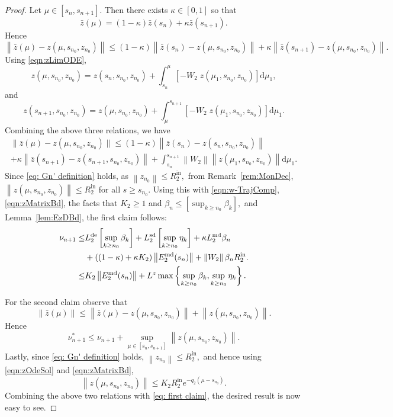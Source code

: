 \documentclass[usenames,dvipsnames,final,12pt]{colt2018} %
\newcommand{\Ww}{W_2}
\newcommand{\lz}{q_2}
\newcommand{\Rzi}{R_2^{\textrm{in}}}
\newcommand{\rz}{\nu}
\newcommand{\rzS}{\nu^{*}}
\newcommand{\barz}{\bar{z}}
\newcommand{\Ez}{E_2}
\newcommand{\Lz}{L^z}
\newcommand{\LzD}{L_2^{\dt}}
\newcommand{\LzM}{L_2^{\md}}
\newcommand{\LzS}{L_2^{\sd}}
\newcommand{\Kz}{K_2}
\newcommand{\EzM}{\Ez^{\md}}
\newcommand{\zSol}[1]{z(#1, \sI{n_0}, z_{n_0})}
\newcommand{\dt}{\text{de}}
\newcommand{\md}{\text{md}}
\newcommand{\sd}{\text{sd}}
\newcommand{\df}{\mathrm{d}}
\newcommand{\sI}[1]{s_{#1}}
\newcommand{\norm}[1]{\left\lVert#1\right\rVert}
\newcommand{\gal}[1]{#1}
\begin{document}
\begin{proof}
Let $\mu \in [\sI{n}, \sI{n+ 1}].$ Then there exists $\kappa \in [0,1]$ so that
%
\[
\barz(\mu) = (1 - \kappa) \barz(\sI{n}) + \kappa \barz(\sI{n + 1}).
\]
%
Hence
%
\[
\norm{\barz(\mu) - \zSol{\mu}} \leq   (1 - \kappa) \norm{\barz(\sI{n}) - \zSol{\mu}} + \kappa \norm{\barz(\sI{n + 1}) - \zSol{\mu}}.
\]
%
Using \eqref{eqn:zLimODE},
%
\[
\zSol{\mu} = \zSol{\sI{n}} + \int_{\sI{n}}^{\mu} [- \Ww \; \zSol{\mu_1}] \df \mu_1,
\]
%
and
%
\[
\zSol{\sI{n + 1}} = \zSol{\mu} + \int_{\mu}^{\sI{n + 1}} [- \Ww \; \zSol{\mu_1}] \df \mu_1.
\]
%
Combining the above three relations, we have
%
\begin{multline*}
\|\barz(\mu) - \zSol{\mu}\| \leq (1 - \kappa) \norm{\barz(\sI{n}) - \zSol{\sI{n}}}\\ + \kappa \norm{\barz(\sI{n + 1}) - \zSol{\sI{n + 1}}} + \int_{\sI{n}}^{\sI{n + 1}} \norm{\Ww} \norm{\zSol{\mu_1}} \df \mu_1.
\end{multline*}
%
\gal{Since \eqref{eq: Gn' definition} holds, as} $\norm{z_{n_0}} \leq \Rzi,$ from Remark~\ref{rem:MonDec}, $\norm{\zSol{\mu}} \leq \Rzi$ for all $s \geq \sI{n_0}.$ Using this with \eqref{eqn:w-TrajComp}, \eqref{eqn:zMatrixBd}, the facts that $\Kz \geq 1$ and $\beta_n \leq [\sup_{k \geq n_0} \beta_k],$ and Lemma~\ref{lem:EzDBd}, the first claim follows:
\begin{align}
\rz_{n + 1}
\leq
&\LzD\left[\sup_{k \geq n_0}\beta_k\right] +  \LzS\left[\sup_{k \geq n_0}\eta_k\right]  + \kappa\LzM\beta_n
\notag
\\
&+ ((1-\kappa)+ \kappa \Kz)\norm{\EzM(\sI{n})} +\norm{\Ww} \beta_n \Rzi.
\notag
\\
\leq& \Kz \norm{\EzM(\sI{n})} + \Lz \max \left\{\sup_{k \geq n_0} \beta_k, \sup_{k \geq n_0} \eta_k \right\}.
\label{eq: first claim}
\end{align}

For the second claim observe that
%
\[
\norm{\barz(\mu)} \leq \norm{\barz(\mu) - \zSol{\mu}} + \norm{\zSol{\mu}}.
\]
%
Hence
%
\[
\rzS_{n + 1} \leq \rz_{n +1} + \sup_{\mu \in [\sI{n}, \sI{n + 1}]} \norm{\zSol{\mu}}.
\]
%
Lastly, \gal{since \eqref{eq: Gn' definition} holds, }$\norm{z_{n_0}} \leq \Rzi,$ and hence using \eqref{eqn:zOdeSol} and \eqref{eqn:zMatrixBd},
%
\[
\norm{\zSol{\mu}} \leq \Kz \Rzi e^{- \lz (\mu - \sI{n_0})}.
\]
%
Combining the above two relations with \eqref{eq: first claim}, the desired result is now easy to see.
\end{proof}
\end{document}
